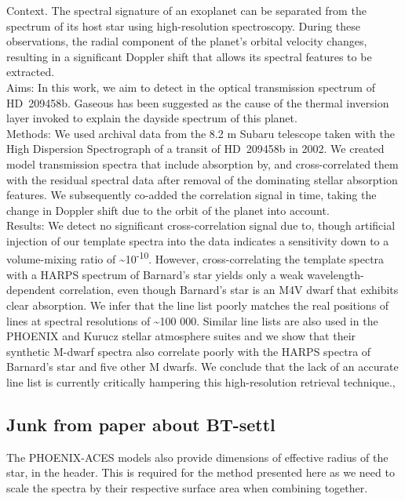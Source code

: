 \citet{hoeijmakers_search_2015}
{Context.
    The spectral signature of an exoplanet can be separated from the spectrum of its host star using high-resolution spectroscopy.
    During these observations, the radial component of the planet's orbital velocity changes, resulting in a significant Doppler shift that allows its spectral features to be extracted.\\
    Aims: In this work, we aim to detect in the optical transmission spectrum of {HD~209458}b.
    Gaseous has been suggested as the cause of the thermal inversion layer invoked to explain the dayside spectrum of this planet.\\
    Methods: We used archival data from the 8.2 m Subaru telescope taken with the High Dispersion Spectrograph of a transit of {HD~209458}b in 2002.
    We created model transmission spectra that include absorption by, and cross-correlated them with the residual spectral data after removal of the dominating stellar absorption features.
    We subsequently co-added the correlation signal in time, taking the change in Doppler shift due to the orbit of the planet into account.\\
    Results: We detect no significant cross-correlation signal due to, though artificial injection of our template spectra into the data indicates a sensitivity down to a volume-mixing ratio of \textasciitilde{}10\textsuperscript{-10}.
    However, cross-correlating the template spectra with a {HARPS} spectrum of Barnard's star yields only a weak wavelength-dependent correlation, even though Barnard's star is an M4V dwarf that exhibits clear  absorption.
    We infer that the line list poorly matches the real positions of lines at spectral resolutions of \textasciitilde{}100 000.
    Similar line lists are also used in the {PHOENIX} and Kurucz stellar atmosphere suites and we show that their synthetic M-dwarf spectra also correlate poorly with the {HARPS} spectra of Barnard's star and five other M dwarfs.
    We conclude that the lack of an accurate line list is currently critically hampering this high-resolution retrieval technique.},




\subsection{Junk from paper about BT-settl}

The {PHOENIX-ACES} models also provide dimensions of effective radius of the star, in the header.
This is required for the method presented here as we need to scale the spectra by their respective surface area when combining together.


